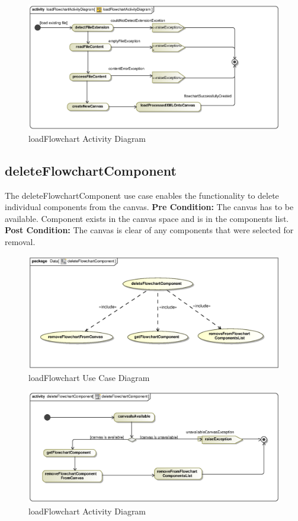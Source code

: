 \documentclass[11pt,a4paper,titlepage]{article}
\begin{document}
\begin{figure}[H]
  \centering
\includegraphics[width=500px]{loadFlowchartActivityDiagram.eps}
\caption{loadFlowchart Activity Diagram}
\end{figure}

\newpage
\subsection{deleteFlowchartComponent}
The deleteFlowchartComponent use case enables the functionality to delete individual components from the canvas.\newline\newline
\textbf{Pre Condition:} The canvas has to be available. Component exists in the canvas space and is in the components list.\newline\newline
\textbf{Post Condition:} The canvas is clear of any components that were selected for removal.

\begin{figure}[H]
  \centering
\includegraphics[width=500px]{deleteFlowchartComponentUseCase.eps}
\caption{loadFlowchart Use Case Diagram}
\end{figure}

\begin{figure}[H]
  \centering
\includegraphics[width=500px]{deleteFlowchartComponentActivity.eps}
\caption{loadFlowchart Activity Diagram}
\end{figure}
\end{document}
